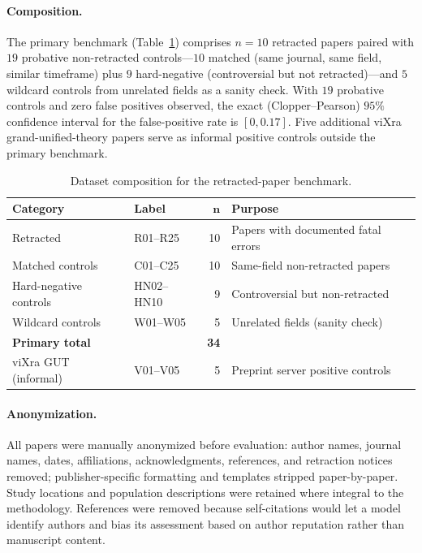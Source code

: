 \documentclass[11pt]{article}
\theoremstyle{definition}
\begin{document}
\paragraph{Composition.} The primary benchmark (Table~\ref{tab:dataset_composition}) comprises $n = 10$ retracted papers paired with $19$ probative non-retracted controls---$10$ matched (same journal, same field, similar timeframe) plus $9$ hard-negative (controversial but not retracted)---and $5$ wildcard controls from unrelated fields as a sanity check. With $19$ probative controls and zero false positives observed, the exact (Clopper--Pearson) $95\%$ confidence interval for the false-positive rate is $[0, 0.17]$. Five additional viXra grand-unified-theory papers serve as informal positive controls outside the primary benchmark.

\begin{table}[ht]
\centering
\caption{Dataset composition for the retracted-paper benchmark.}
\label{tab:dataset_composition}
\small
\begin{tabular}{llrl}
\toprule
\textbf{Category} & \textbf{Label} & $\boldsymbol{n}$ & \textbf{Purpose} \\
\midrule
Retracted               & R01--R25  & 10 & Papers with documented fatal errors \\
Matched controls        & C01--C25  & 10 & Same-field non-retracted papers \\
Hard-negative controls  & HN02--HN10 & 9 & Controversial but non-retracted \\
Wildcard controls       & W01--W05  & 5 & Unrelated fields (sanity check) \\
\midrule
\textbf{Primary total}  &           & \textbf{34} & \\
\midrule
viXra GUT (informal)    & V01--V05  & 5 & Preprint server positive controls \\
\bottomrule
\end{tabular}
\end{table}

\paragraph{Anonymization.} All papers were manually anonymized before evaluation: author names, journal names, dates, affiliations, acknowledgments, references, and retraction notices removed; publisher-specific formatting and templates stripped paper-by-paper. Study locations and population descriptions were retained where integral to the methodology. References were removed because self-citations would let a model identify authors and bias its assessment based on author reputation rather than manuscript content.
\end{document}
